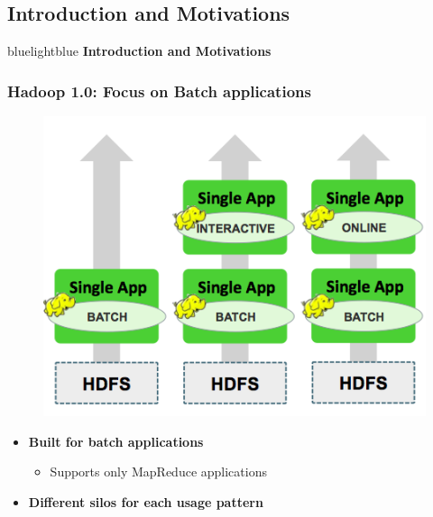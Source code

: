 \subsection{Introduction and Motivations}
\begin{frame}
 \begin{colorblock}{blue}{lightblue}{ }
    \Large \textbf{Introduction and Motivations}
  \end{colorblock}
\end{frame}

\begin{frame}
\frametitle{Hadoop 1.0: Focus on Batch applications}
\begin{figure}[h]
  \centering
  \includegraphics[scale=0.4]{./figures/yarn_hadoop1}
  \label{fig:yarn_h1}
\end{figure}
\begin{itemize}
	\item {\bf Built for batch applications}
	\begin{itemize}
		\item Supports only MapReduce applications
	\end{itemize}
	\item {\bf Different silos for each usage pattern}
\end{itemize}
\end{frame}


